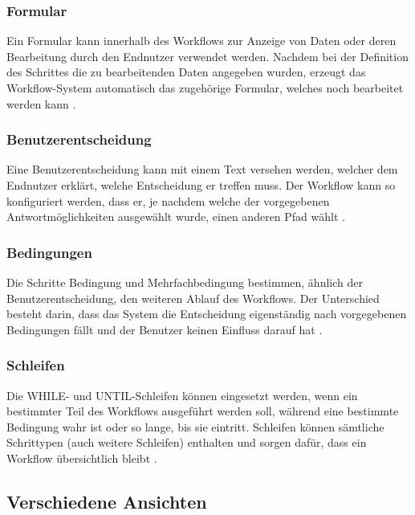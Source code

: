 \subsubsection{Formular}
Ein Formular kann innerhalb des Workflows zur Anzeige von Daten oder deren Bearbeitung durch den Endnutzer verwendet werden. Nachdem bei der Definition des Schrittes die zu bearbeitenden Daten angegeben wurden, erzeugt das Workflow-System automatisch das zugehörige Formular, welches noch bearbeitet werden kann \cite{SAPHelpWf}. 

\subsubsection{Benutzerentscheidung}
Eine Benutzerentscheidung kann mit einem Text versehen werden, welcher dem Endnutzer erklärt, welche Entscheidung er treffen muss. Der Workflow kann so konfiguriert werden, dass er, je nachdem welche der vorgegebenen Antwortmöglichkeiten ausgewählt wurde, einen anderen Pfad wählt \cite{SAPHelpWf}.

\subsubsection{Bedingungen}
Die Schritte Bedingung und Mehrfachbedingung bestimmen, ähnlich der Benutzerentscheidung, den weiteren Ablauf des Workflows. Der Unterschied besteht darin, dass das System die Entscheidung eigenständig nach vorgegebenen Bedingungen fällt und der Benutzer keinen Einfluss darauf hat \cite{SAPHelpWf}.

\subsubsection{Schleifen}
Die WHILE- und UNTIL-Schleifen können eingesetzt werden, wenn ein bestimmter Teil des Workflows ausgeführt werden soll, während eine bestimmte Bedingung wahr ist oder so lange, bis sie eintritt. Schleifen können sämtliche Schrittypen (auch weitere Schleifen) enthalten und sorgen dafür, dass ein Workflow übersichtlich bleibt \cite{SAPHelpWf}.

\subsection{Verschiedene Ansichten}

